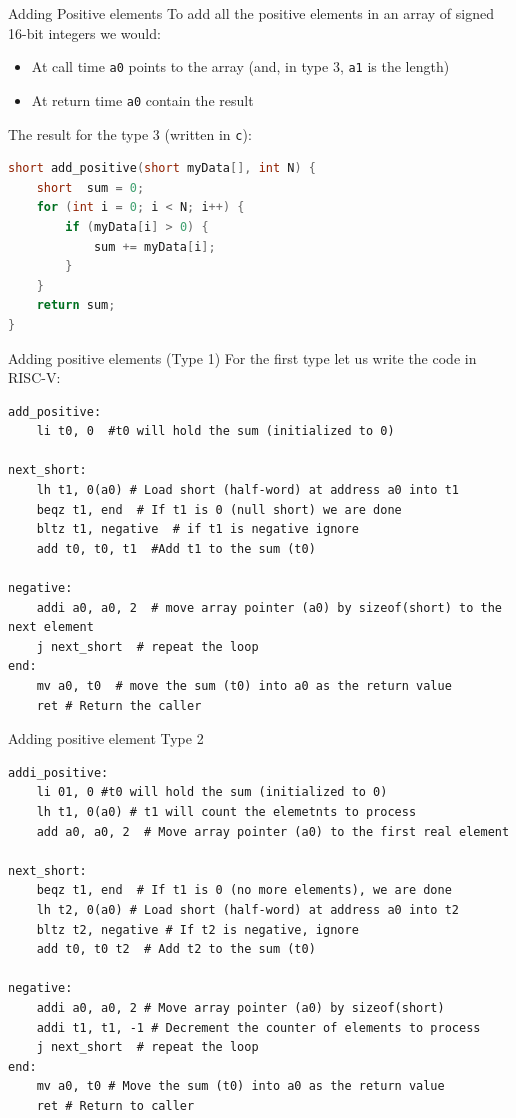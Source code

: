 \begin{parag}{Adding Positive elements}
    To add all the positive elements in an array of signed 16-bit integers we would:
	\begin{itemize}
	    \item At call time \textrightarrow \texttt{a0} points to the array (and, in type 3, \texttt{a1} is the length)
	    \item At return time \textrightarrow \texttt{a0} contain the result
	\end{itemize}
	The result for the type 3 (written in \texttt{c}):
	\begin{lstlisting}[language=c]
short add_positive(short myData[], int N) {
	short  sum = 0;
	for (int i = 0; i < N; i++) {
		if (myData[i] > 0) {
			sum += myData[i];
		}
	}
	return sum;
}
	\end{lstlisting}
\end{parag}
\begin{parag}{Adding positive elements (Type 1)}
    For the first type let us write the code in RISC-V:
	\begin{lstlisting}[language={[RISC-V]Assembler}]
add_positive:
	li t0, 0  #t0 will hold the sum (initialized to 0)

next_short:
	lh t1, 0(a0) # Load short (half-word) at address a0 into t1
	beqz t1, end  # If t1 is 0 (null short) we are done
	bltz t1, negative  # if t1 is negative ignore
	add t0, t0, t1  #Add t1 to the sum (t0)

negative:
	addi a0, a0, 2  # move array pointer (a0) by sizeof(short) to the next element
	j next_short  # repeat the loop
end:
	mv a0, t0  # move the sum (t0) into a0 as the return value
	ret # Return the caller
	\end{lstlisting}
	
	
\end{parag}

\begin{parag}{Adding positive element Type 2}
	\begin{lstlisting}[language={[RISC-V]Assembler}]
addi_positive:
	li 01, 0 #t0 will hold the sum (initialized to 0)
	lh t1, 0(a0) # t1 will count the elemetnts to process
	add a0, a0, 2  # Move array pointer (a0) to the first real element

next_short:
	beqz t1, end  # If t1 is 0 (no more elements), we are done
	lh t2, 0(a0) # Load short (half-word) at address a0 into t2
	bltz t2, negative # If t2 is negative, ignore
	add t0, t0 t2  # Add t2 to the sum (t0)

negative:
	addi a0, a0, 2 # Move array pointer (a0) by sizeof(short)
	addi t1, t1, -1 # Decrement the counter of elements to process
	j next_short  # repeat the loop
end:
	mv a0, t0 # Move the sum (t0) into a0 as the return value
	ret # Return to caller
\end{lstlisting}

\end{parag}



